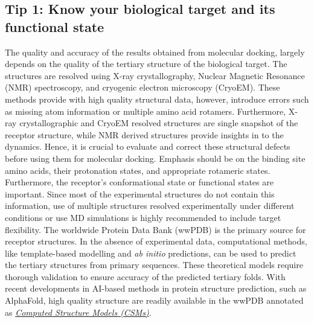 \documentclass[10pt,letterpaper]{article}
\begin{document}
{{\subsection*{Tip 1: Know your biological target and its functional state}
The quality and accuracy of the results obtained from molecular docking, largely depends on the quality of the tertiary structure of the biological target. The structures are resolved using X-ray crystallography, Nuclear Magnetic Resonance (NMR) spectroscopy, and cryogenic electron microscopy (CryoEM). These methods provide with high quality structural data, however, introduce errors such as missing atom information or multiple amino acid rotamers\cite{bib55, bib56}. Furthermore, X-ray crystallographic and CryoEM resolved structures are single snapshot of the receptor structure, while NMR derived structures provide insights in to the dynamics. Hence, it is crucial to evaluate and correct these structural defects before using them for molecular docking. Emphasis should be on the binding site amino acids, their protonation states, and appropriate rotameric states. Furthermore, the receptor's conformational state or functional states are important. Since most of the experimental structures do not contain this information, use of multiple structures resolved experimentally under different conditions or use MD simulations is highly recommended to include target flexibility. The worldwide Protein Data Bank (wwPDB) is the primary source for receptor structures\cite{bib41}. In the absence of experimental data, computational methods, like template-based modelling and \textit{ab initio} predictions, can be used to predict the tertiary structures from primary sequences.  These theoretical models require thorough validation to ensure accuracy of the predicted tertiary folds. With recent developments in AI-based methods in protein structure prediction, such as AlphaFold\cite{bib37}, high quality structure are readily available in the wwPDB annotated as \href{https://pdb101.rcsb.org/learn/guide-to-understanding-pdb-data/computed-structure-models}{\textit{Computed Structure Models (CSMs)}}.

}}
\end{document}
